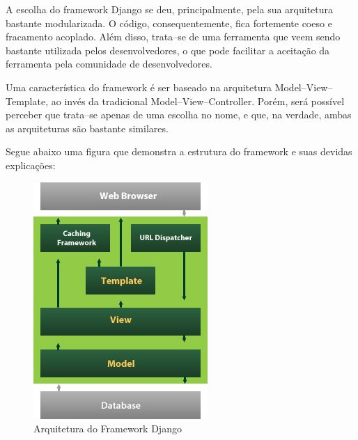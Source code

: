 \documentclass[graduacao,brazil]{ThesisPUC}
\begin{document}
A escolha do framework Django \cite{Django} se deu, principalmente, pela sua arquitetura bastante modularizada.
O c\'{o}digo, consequentemente, fica fortemente coeso e fracamento acoplado. Al\'{e}m disso, trata--se
de uma ferramenta que veem sendo bastante utilizada pelos desenvolvedores, o que pode facilitar
a aceita\c{c}\~{a}o da ferramenta pela comunidade de desenvolvedores.

Uma caracter\'{i}stica do framework \'{e} ser baseado na arquitetura Model--View--Template, ao inv\'{e}s
da tradicional Model--View--Controller. Por\'{e}m, ser\'{a} poss\'{i}vel perceber que trata--se apenas de
uma escolha no nome, e que, na verdade, ambas as arquiteturas s\~{a}o bastante similares.

Segue abaixo uma figura que demonstra a estrutura do framework e suas devidas explica\c{c}\~{o}es:

\begin{figure}[H]
    \centering
    \includegraphics[width=\linewidth]{Imagens/django_structure.png}
    \caption{Arquitetura do Framework Django}
\end{figure}
\end{document}
